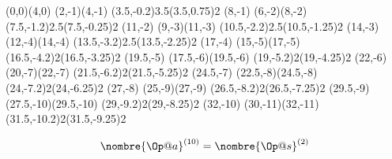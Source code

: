 \documentclass[a4paper,12pt,leqno]{book}
\begin{document}

\makeatletter
\oplput(0,0){\nombre{\Op@a}}\oplput(4,0){\Op@b}%
\oplput(2,-1){\color{red}\bfseries\Op@r}\oplput(4,-1){\nombre{\Op@q}}%
\ophline(3.5,-0.2){3.5}\opvline(3.5,0.75){2}%
\oplput(8,-1){\Op@b}%
\oplput(6,-2){\color{red}\bfseries\Op@rr}\oplput(8,-2){\Op@qq}
\ophline(7.5,-1.2){2.5}\opvline(7.5,-0.25){2}
\oplput(11,-2){\Op@b}%
\oplput(9,-3){\color{red}\bfseries\Op@rrr}\oplput(11,-3){\Op@qqq}
\ophline(10.5,-2.2){2.5}\opvline(10.5,-1.25){2}
\oplput(14,-3){\Op@b}%
\oplput(12,-4){\color{red}\bfseries\Op@rrrr}\oplput(14,-4){\Op@qqqq}
\ophline(13.5,-3.2){2.5}\opvline(13.5,-2.25){2}
\oplput(17,-4){\Op@b}%
\oplput(15,-5){\color{red}\bfseries\Op@rrrrr}\oplput(17,-5){\Op@qqqqq}
\ophline(16.5,-4.2){2}\opvline(16.5,-3.25){2}
\oplput(19.5,-5){\Op@b}%
\oplput(17.5,-6){\color{red}\bfseries\Op@rrrrrr}\oplput(19.5,-6){\Op@qqqqqq}
\ophline(19,-5.2){2}\opvline(19,-4.25){2}
\oplput(22,-6){\Op@b}%
\oplput(20,-7){\color{red}\bfseries\Op@rrrrrrr}\oplput(22,-7){\Op@qqqqqqq}
\ophline(21.5,-6.2){2}\opvline(21.5,-5.25){2}
\oplput(24.5,-7){\Op@b}%
\oplput(22.5,-8){\color{red}\bfseries\Op@rrrrrrrr}\oplput(24.5,-8){\Op@qqqqqqqq}
\ophline(24,-7.2){2}\opvline(24,-6.25){2}
\oplput(27,-8){\Op@b}%
\oplput(25,-9){\color{red}\bfseries\Op@rrrrrrrrr}\oplput(27,-9){\Op@qqqqqqqqq}
\ophline(26.5,-8.2){2}\opvline(26.5,-7.25){2}
\oplput(29.5,-9){\Op@b}%
\oplput(27.5,-10){\color{red}\bfseries\Op@rrrrrrrrrr}\oplput(29.5,-10){\Op@qqqqqqqqqq}
\ophline(29,-9.2){2}\opvline(29,-8.25){2}
\oplput(32,-10){\Op@b}%
\oplput(30,-11){\color{red}\bfseries\Op@rrrrrrrrrrr}\oplput(32,-11){\Op@qqqqqqqqqqq}
\ophline(31.5,-10.2){2}\opvline(31.5,-9.25){2}

\[\nombre{\Op@a}^{(10)}=\nombre{\Op@s}^{(2)}\]
\makeatother
\end{document}
